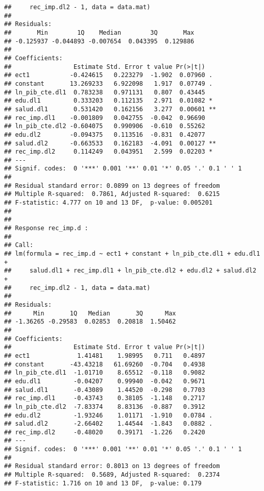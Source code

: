 \documentclass[]{book}
\newenvironment{Shaded}{\begin{snugshade}}{\end{snugshade}}
\newcommand{\KeywordTok}[1]{\textcolor[rgb]{0.13,0.29,0.53}{\textbf{#1}}}
\newcommand{\DecValTok}[1]{\textcolor[rgb]{0.00,0.00,0.81}{#1}}
\newcommand{\StringTok}[1]{\textcolor[rgb]{0.31,0.60,0.02}{#1}}
\newcommand{\OperatorTok}[1]{\textcolor[rgb]{0.81,0.36,0.00}{\textbf{#1}}}
\newcommand{\NormalTok}[1]{#1}
\theoremstyle{definition}
\theoremstyle{definition}
\theoremstyle{definition}
\theoremstyle{remark}
\begin{document}
\begin{verbatim}
##     rec_imp.dl2 - 1, data = data.mat)
## 
## Residuals:
##       Min        1Q    Median        3Q       Max 
## -0.125937 -0.044893 -0.007654  0.043395  0.129886 
## 
## Coefficients:
##                 Estimate Std. Error t value Pr(>|t|)   
## ect1           -0.424615   0.223279  -1.902  0.07960 . 
## constant       13.269233   6.922098   1.917  0.07749 . 
## ln_pib_cte.dl1  0.783238   0.971131   0.807  0.43445   
## edu.dl1         0.333203   0.112135   2.971  0.01082 * 
## salud.dl1       0.531420   0.162156   3.277  0.00601 **
## rec_imp.dl1    -0.001809   0.042755  -0.042  0.96690   
## ln_pib_cte.dl2 -0.604075   0.990906  -0.610  0.55262   
## edu.dl2        -0.094375   0.113516  -0.831  0.42077   
## salud.dl2      -0.663533   0.162183  -4.091  0.00127 **
## rec_imp.dl2     0.114249   0.043951   2.599  0.02203 * 
## ---
## Signif. codes:  0 '***' 0.001 '**' 0.01 '*' 0.05 '.' 0.1 ' ' 1
## 
## Residual standard error: 0.0899 on 13 degrees of freedom
## Multiple R-squared:  0.7861, Adjusted R-squared:  0.6215 
## F-statistic: 4.777 on 10 and 13 DF,  p-value: 0.005201
## 
## 
## Response rec_imp.d :
## 
## Call:
## lm(formula = rec_imp.d ~ ect1 + constant + ln_pib_cte.dl1 + edu.dl1 + 
##     salud.dl1 + rec_imp.dl1 + ln_pib_cte.dl2 + edu.dl2 + salud.dl2 + 
##     rec_imp.dl2 - 1, data = data.mat)
## 
## Residuals:
##      Min       1Q   Median       3Q      Max 
## -1.36265 -0.29583  0.02853  0.20818  1.50462 
## 
## Coefficients:
##                 Estimate Std. Error t value Pr(>|t|)  
## ect1             1.41481    1.98995   0.711   0.4897  
## constant       -43.43218   61.69260  -0.704   0.4938  
## ln_pib_cte.dl1  -1.01710    8.65512  -0.118   0.9082  
## edu.dl1         -0.04207    0.99940  -0.042   0.9671  
## salud.dl1       -0.43089    1.44520  -0.298   0.7703  
## rec_imp.dl1     -0.43743    0.38105  -1.148   0.2717  
## ln_pib_cte.dl2  -7.83374    8.83136  -0.887   0.3912  
## edu.dl2         -1.93246    1.01171  -1.910   0.0784 .
## salud.dl2       -2.66402    1.44544  -1.843   0.0882 .
## rec_imp.dl2     -0.48020    0.39171  -1.226   0.2420  
## ---
## Signif. codes:  0 '***' 0.001 '**' 0.01 '*' 0.05 '.' 0.1 ' ' 1
## 
## Residual standard error: 0.8013 on 13 degrees of freedom
## Multiple R-squared:  0.5689, Adjusted R-squared:  0.2374 
## F-statistic: 1.716 on 10 and 13 DF,  p-value: 0.179
\end{verbatim}

\begin{Shaded}
\end{Shaded}
\end{document}
